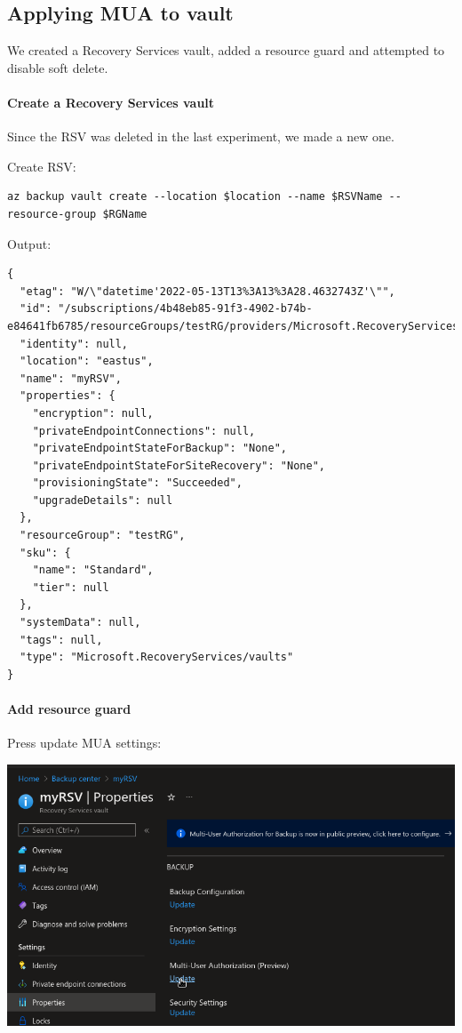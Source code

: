 \subsection{Applying MUA to vault}
\label{app:chs3e3}
We created a Recovery Services vault, added a resource guard and attempted to disable soft delete.

\paragraph{Create a Recovery Services vault}
\label{sec:org0ba319f}
Since the RSV was deleted in the last experiment,
we made a new one.

Create RSV:
\begin{verbatim}
az backup vault create --location $location --name $RSVName --resource-group $RGName
\end{verbatim}

Output:
\begin{verbatim}
{
  "etag": "W/\"datetime'2022-05-13T13%3A13%3A28.4632743Z'\"",
  "id": "/subscriptions/4b48eb85-91f3-4902-b74b-e84641fb6785/resourceGroups/testRG/providers/Microsoft.RecoveryServices/vaults/myRSV",
  "identity": null,
  "location": "eastus",
  "name": "myRSV",
  "properties": {
    "encryption": null,
    "privateEndpointConnections": null,
    "privateEndpointStateForBackup": "None",
    "privateEndpointStateForSiteRecovery": "None",
    "provisioningState": "Succeeded",
    "upgradeDetails": null
  },
  "resourceGroup": "testRG",
  "sku": {
    "name": "Standard",
    "tier": null
  },
  "systemData": null,
  "tags": null,
  "type": "Microsoft.RecoveryServices/vaults"
}
\end{verbatim}
\paragraph{Add resource guard}
\label{sec:org4eeccf2}
Press update MUA settings:
\begin{center}
\includegraphics[width=.9\linewidth]{figures/mua/update_rsv_mua.png}
\end{center}

